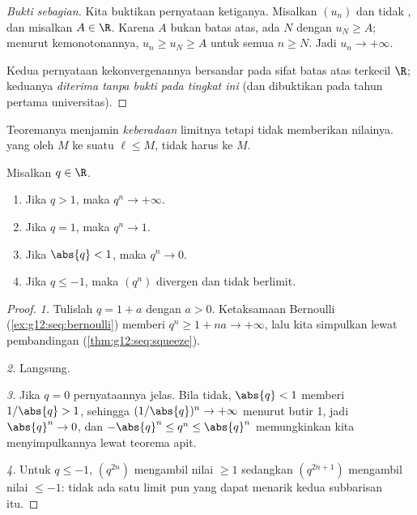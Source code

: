 \begin{proof}[Bukti sebagian]
Kita buktikan pernyataan ketiganya. Misalkan $(u_n)$  dan tidak , dan misalkan $A \in \R$. Karena $A$ bukan batas atas, ada $N$
dengan $u_N \geq A$; menurut kemonotonannya, $u_n \geq u_N \geq A$ untuk semua
$n \geq N$. Jadi $u_n \to +\infty$.

Kedua pernyataan kekonvergenannya bersandar pada sifat batas atas terkecil
$\R$; keduanya \emph{diterima tanpa bukti pada tingkat ini} (dan dibuktikan
pada tahun pertama universitas).
\end{proof}

\begin{remark}
Teoremanya menjamin \emph{keberadaan} limitnya tetapi tidak memberikan
nilainya.   yang  oleh $M$  ke suatu
$\ell \leq M$, tidak harus ke $M$.
\end{remark}

\begin{theorem}\label{thm:g12:seq:geometric}
Misalkan $q \in \R$.
\begin{enumerate}
  \item Jika $q > 1$, maka $q^n \to +\infty$.
  \item Jika $q = 1$, maka $q^n \to 1$.
  \item Jika $\abs{q} < 1$, maka $q^n \to 0$.
  \item Jika $q \leq -1$, maka $(q^n)$ divergen dan tidak berlimit.
\end{enumerate}
\end{theorem}

\begin{proof}
\emph{1.} Tulislah $q = 1 + a$ dengan $a > 0$. Ketaksamaan Bernoulli
(\cref{ex:g12:seq:bernoulli}) memberi $q^n \geq 1 + na \to +\infty$, lalu kita
simpulkan lewat pembandingan (\cref{thm:g12:seq:squeeze}).

\emph{2.} Langsung.

\emph{3.} Jika $q = 0$ pernyataannya jelas. Bila tidak, $\abs{q} < 1$ memberi
$1/\abs{q} > 1$, sehingga $(1/\abs{q})^n \to +\infty$ menurut butir 1, jadi
$\abs{q}^n \to 0$, dan $-\abs{q}^n \leq q^n \leq \abs{q}^n$ memungkinkan kita
menyimpulkannya lewat teorema apit.

\emph{4.} Untuk $q \leq -1$, $(q^{2n})$ mengambil nilai $\geq 1$ sedangkan
$(q^{2n+1})$ mengambil nilai $\leq -1$: tidak ada satu limit pun yang dapat
menarik kedua subbarisan itu.
\end{proof}

